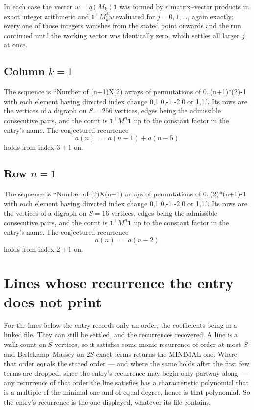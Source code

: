 \documentclass[11pt,a4paper]{article}
\theoremstyle{plain}
\theoremstyle{definition}
\begin{document}
In each case the vector $w=q(M_k)\mathbf{1}$ was formed by $r$ matrix--vector products in
exact integer arithmetic and $\mathbf{1}^{\!\top}M_k^{j}w$ evaluated for $j=0,1,\dots$,
again exactly; every one of those integers vanishes from the stated point onwards and the run
continued until the working vector was identically zero, which settles all larger $j$ at once.

\subsection*{Column $k$$=1$}
The sequence is ``Number of (n+1)X(2) arrays of permutations of 0..(n+1)*(2)-1 with each element having directed index change 0,1 0,-1 -2,0 or 1,1.''. Its rows are the vertices of a digraph on
$S=256$ vertices, edges being the admissible consecutive pairs, and the count is
$\mathbf{1}^{\!\top}M^{n}\mathbf{1}$ up to the constant factor in the entry's name.
The conjectured recurrence
\[
a(n)\;=\;a(n-1) + a(n-5)
\]
holds from index $3+1$ on.

\subsection*{Row $n$$=1$}
The sequence is ``Number of (2)X(n+1) arrays of permutations of 0..(2)*(n+1)-1 with each element having directed index change 0,1 0,-1 -2,0 or 1,1.''. Its rows are the vertices of a digraph on
$S=16$ vertices, edges being the admissible consecutive pairs, and the count is
$\mathbf{1}^{\!\top}M^{n}\mathbf{1}$ up to the constant factor in the entry's name.
The conjectured recurrence
\[
a(n)\;=\;a(n-2)
\]
holds from index $2+1$ on.


\section{Lines whose recurrence the entry does not print}

For the lines below the entry records only an order, the coefficients being in a linked file.
They can still be settled, and the recurrences recovered. A line is a walk count on $S$
vertices, so it satisfies some monic recurrence of order at most $S$ and Berlekamp--Massey on
$2S$ exact terms returns the MINIMAL one. Where that order equals the stated order --- and
where the same holds after the first few terms are dropped, since the entry's recurrence may
begin only partway along --- any recurrence of that order the line satisfies has a
characteristic polynomial that is a multiple of the minimal one and of equal degree, hence is
that polynomial. So the entry's recurrence is the one displayed, whatever its file contains.
\end{document}
